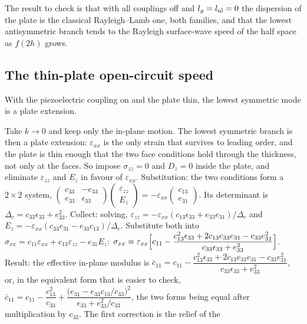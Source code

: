 \documentclass[11pt]{article}
\makeatletter
\newif\ifshowworked
\newenvironment{worked}{%
  \ifshowworked\par\smallskip\noindent\textit{Working.}\par\smallskip\else
  \setbox\z@\vbox\bgroup\fi}{\ifshowworked\par\smallskip\else\egroup\fi}
\makeatother
\begin{document}
The result to check is that with all couplings off and $l_g=l_{\rm nl}=0$ the dispersion of the plate is
the classical Rayleigh--Lamb one, both families, and that the lowest antisymmetric branch tends to the
Rayleigh surface-wave speed of the half space as $f(2h)$ grows.

\subsection*{The thin-plate open-circuit speed}

With the piezoelectric coupling on and the plate thin, the lowest symmetric mode is a plate extension.

\begin{worked}
Take $k\to0$ and keep only the in-plane motion. The lowest symmetric branch is then a plate extension:
$\varepsilon_{xx}$ is the only strain that survives to leading order, and the plate is thin enough that
the two face conditions hold through the thickness, not only at the faces. So impose
$\sigma_{zz}=0$ and $D_z=0$ inside the plate, and eliminate $\varepsilon_{zz}$ and $E_z$ in favour of
$\varepsilon_{xx}$.
Substitution: the two conditions form a $2\times2$ system,
$\begin{pmatrix}c_{33}&-e_{33}\\ e_{33}&\epsilon_{33}\end{pmatrix}
\begin{pmatrix}\varepsilon_{zz}\\ E_z\end{pmatrix}
=-\varepsilon_{xx}\begin{pmatrix}c_{13}\\ e_{31}\end{pmatrix}$.
Its determinant is $\Delta_c=c_{33}\epsilon_{33}+e_{33}^2$.
Collect: solving,
$\varepsilon_{zz}=-\varepsilon_{xx}(c_{13}\epsilon_{33}+e_{33}e_{31})/\Delta_c$ and
$E_z=-\varepsilon_{xx}(c_{33}e_{31}-e_{33}c_{13})/\Delta_c$.
Substitute both into $\sigma_{xx}=c_{11}\varepsilon_{xx}+c_{13}\varepsilon_{zz}-e_{31}E_z$:
$\sigma_{xx}=\varepsilon_{xx}\Bigl[c_{11}-\dfrac{c_{13}^2\epsilon_{33}+2c_{13}e_{33}e_{31}-c_{33}e_{31}^2}
{c_{33}\epsilon_{33}+e_{33}^2}\Bigr]$.
Result: the effective in-plane modulus is
$\bar c_{11}=c_{11}-\dfrac{c_{13}^2\epsilon_{33}+2c_{13}e_{33}e_{31}-c_{33}e_{31}^2}
{c_{33}\epsilon_{33}+e_{33}^2}$,
or, in the equivalent form that is easier to check,
$\bar c_{11}=c_{11}-\dfrac{c_{13}^2}{c_{33}}
+\dfrac{\bigl(e_{31}-e_{33}c_{13}/c_{33}\bigr)^2}{\epsilon_{33}+e_{33}^2/c_{33}}$,
the two forms being equal after multiplication by $c_{33}$. The first correction is the relief of the

\end{worked}
\end{document}
